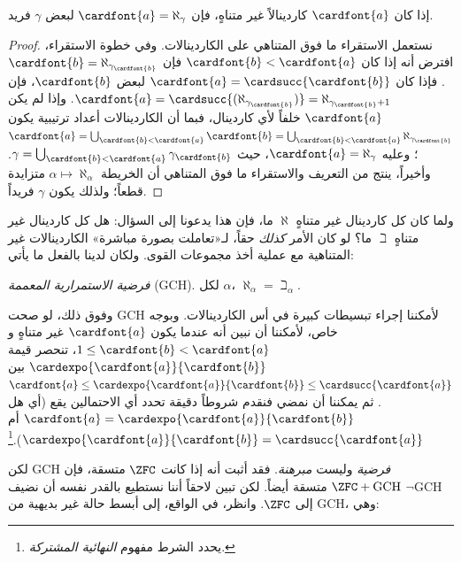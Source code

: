 \documentclass[../../../include/open-logic-section]{subfiles}
\begin{document}
\begin{prop}
إذا كان $\cardfont{a}$ كاردينالاً غير متناهٍ، فإن
$\cardfont{a} = \aleph_\gamma$ لبعض $\gamma$ فريد.
\end{prop}

\begin{proof}
نستعمل الاستقراء ما فوق المتناهي على الكاردينالات. وفي خطوة الاستقراء،
افترض أنه إذا كان $\cardfont{b} < \cardfont{a}$ فإن
$\cardfont{b} = \aleph_{\gamma_\cardfont{b}}$. فإذا كان
$\cardfont{a} = \cardsucc{\cardfont{b}}$ لبعض $\cardfont{b}$، فإن
$\cardfont{a} = \cardsucc{(\aleph_{\gamma_\cardfont{b}})}=
\aleph_{\gamma_\cardfont{b}+1}$. وإذا لم يكن $\cardfont{a}$ خلفاً لأي
كاردينال، فبما أن الكاردينالات أعداد ترتيبية يكون
$\cardfont{a} = \bigcup_{\cardfont{b} < \cardfont{a}} \cardfont{b} =
\bigcup_{\cardfont{b} < \cardfont{a}}{\aleph_{\gamma_\cardfont{b}}}$؛
وعليه $\cardfont{a} = \aleph_\gamma$، حيث
$\gamma = \bigcup_{\cardfont{b} < \cardfont{a}}
\gamma_\cardfont{b}$. وأخيراً، ينتج من التعريف والاستقراء ما فوق
المتناهي أن الخريطة $\alpha\mapsto\aleph_\alpha$ متزايدة قطعاً؛ ولذلك
يكون $\gamma$ فريداً.
\end{proof}

ولما كان كل كاردينال غير متناهٍ $\aleph$ ما، فإن هذا يدعونا إلى السؤال:
هل كل كاردينال غير متناهٍ $\beth$ ما؟ لو كان الأمر \emph{كذلك} حقاً،
لـ«تعاملت بصورة مباشرة» الكاردينالات غير المتناهية مع عملية أخذ مجموعات
القوى. ولكان لدينا بالفعل ما يأتي:

\begin{defish}
\emph{فرضية الاستمرارية المعممة} (GCH). لكل $\alpha$،
$\aleph_\alpha = \beth_\alpha$.
\end{defish}

وفوق ذلك، لو صحت GCH لأمكننا إجراء تبسيطات كبيرة في أس الكاردينالات.
وبوجه خاص، لأمكننا أن نبين أنه عندما يكون $\cardfont{a}$ غير متناهٍ
و$1 \leq \cardfont{b} < \cardfont{a}$، تنحصر قيمة
$\cardexpo{\cardfont{a}}{\cardfont{b}}$ بين
$\cardfont{a}\leq \cardexpo{\cardfont{a}}{\cardfont{b}} \leq
\cardsucc{\cardfont{a}}$. ثم يمكننا أن نمضي فنقدم شروطاً دقيقة تحدد أي
الاحتمالين يقع (أي هل
$\cardfont{a} = \cardexpo{\cardfont{a}}{\cardfont{b}}$ أم
$\cardexpo{\cardfont{a}}{\cardfont{b}} =
\cardsucc{\cardfont{a}}$).\footnote{يحدد الشرط مفهوم
\emph{النهائية المشتركة}.}

لكن GCH \emph{فرضية} وليست \emph{مبرهنة}. فقد أثبت
\citet{Godel1938} أنه إذا كانت $\ZFC$ متسقة، فإن
$\ZFC + \text{GCH}$ متسقة أيضاً. لكن تبين لاحقاً أننا نستطيع بالقدر نفسه
أن نضيف $\lnot$GCH إلى $\ZFC$. وانظر، في الواقع، إلى أبسط حالة غير
بديهية من GCH، وهي:
\end{document}

